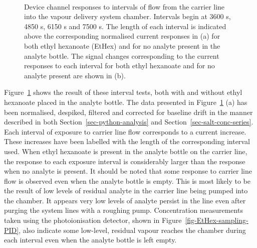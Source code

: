 \documentclass[
  a4paper,
]{scrbook}
\begin{document}
\begin{figure}
\begin{minipage}[t]{0.70\linewidth}
{}

\end{minipage}%
%
\begin{minipage}[t]{0.15\linewidth}

{\centering 

~

}

\end{minipage}%

\caption{\label{fig-EtHex-sampling}Device channel responses to intervals
of flow from the carrier line into the vapour delivery system chamber.
Intervals begin at 3600 s, 4850 s, 6150 s and 7500 s. The length of each
interval is indicated above the corresponding normalised current
responses in (a) for both ethyl hexanoate (EtHex) and for no analyte
present in the analyte bottle. The signal changes corresponding to the
current responses to each interval for both ethyl hexanoate and for no
analyte present are shown in (b).}

\end{figure}

Figure~\ref{fig-EtHex-sampling} shows the result of these interval
tests, both with and without ethyl hexanoate placed in the analyte
bottle. The data presented in Figure~\ref{fig-EtHex-sampling} (a) has
been normalised, despiked, filtered and corrected for baseline drift in
the manner described in both Section~\ref{sec-python-analysis} and
Section~\ref{sec-salt-conc-series}. Each interval of exposure to carrier
line flow corresponds to a current increase. These increases have been
labelled with the length of the corresponding interval used. When ethyl
hexanoate is present in the analyte bottle on the carrier line, the
response to each exposure interval is considerably larger than the
response when no analyte is present. It should be noted that some
response to carrier line flow is observed even when the analyte bottle
is empty. This is most likely to be the result of low levels of residual
analyte in the carrier line being pumped into the chamber. It appears
very low levels of analyte persist in the line even after purging the
system lines with a roughing pump. Concentration measurements taken
using the photoionisation detector, shown in
Figure~\ref{fig-EtHex-sampling-PID}, also indicate some low-level,
residual vapour reaches the chamber during each interval even when the
analyte bottle is left empty.
\end{document}
